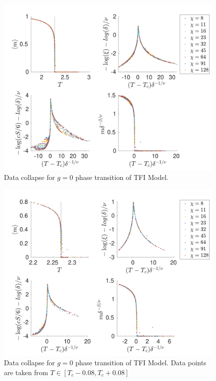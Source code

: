 \begin{figure}[!htbp]
    \center
    \includegraphics[width=\textwidth]{Figuren/phasediag/g0/Full.pdf}
    \caption{ Data collapse for $g=0$ phase transition of \Gls{TFI} Model. }
    \label{fig:phase:g0:full}
\end{figure}
\begin{figure}[!htbp]
    \center
    \includegraphics[width=\textwidth]{Figuren/phasediag/g0/zoomed.pdf}
    \caption{ Data collapse for $g=0$ phase transition of \Gls{TFI} Model. Data points are taken from $T \in \left[ T_c -0.08, T_c +0.08 \right]$ }
    \label{fig:phase:g0:zoomed}
\end{figure}

